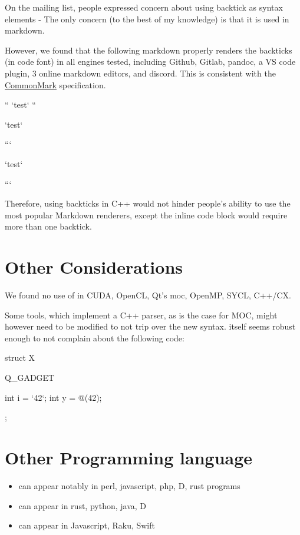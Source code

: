 \documentclass{wg21}
\begin{document}
    On the mailing list, people expressed concern about using backtick as syntax elements - The only concern (to the best of my knowledge) is that it
    is used in markdown.
    
    However, we found that the following markdown properly renders the backticks (in code font) in all engines tested, including Github, Gitlab, pandoc, a VS code plugin, 3 online markdown editors,
    and discord. This is consistent with the \href{https://spec.commonmark.org/0.29/#code-spans}{CommonMark} specification.
    
    \begin{colorblock}
        `` `test` ``
        
        `test`
        
        ```
        
        `test`
        
        ```
    \end{colorblock}
    
    
    Therefore, using backticks in C++ would not hinder people's ability to use the most popular Markdown renderers, except the inline code block would require more than one backtick.
    
    \section{Other Considerations}
    
    We found no use of  in CUDA, OpenCL, Qt's moc, OpenMP, SYCL, C++/CX.
    
    Some tools, which implement a C++ parser, as is the case for MOC, might however need to be modified to not trip over the new syntax.
     itself seems robust enough to not complain about the following code:
    
    \begin{colorblock}
        struct X{
            Q_GADGET
            
            int i = `42`;
            int y = @\atsign@(42);
        };
    \end{colorblock}
    
    \section{Other Programming language}
    
    \begin{itemize}
        \item \tcode{\$} can appear notably in perl, javascript, php, D, rust programs
        \item {} can appear in rust, python, java, D
        \item \tcode{\textasciigrave} can appear in Javascript, Raku, Swift
    \end{itemize}
    
\end{document}
